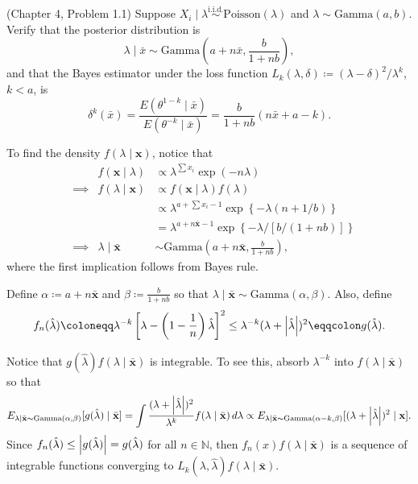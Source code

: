 \begin{question}
  (Chapter 4, Problem 1.1) Suppose \( X_i \mid \lambda \overset{\text{i.i.d.}}{\sim} \mathrm{Poisson}(\lambda)\) and \( \lambda \sim \mathrm{Gamma}(a,b) \). Verify that the posterior distribution is
  \[
    \lambda \mid \bar{x} \sim \mathrm{Gamma}\left( a + n\bar{x}, \frac{b}{1+nb} \right),
  \]
  and that the Bayes estimator under the loss function \( L_k(\lambda, \delta) \coloneqq  (\lambda - \delta)^2 / \lambda^{k} \), \( k < a \), is
  \[
    \delta^{k}(\bar{x}) = \frac{E(\theta^{1-k} \mid  \bar{x})}{E(\theta^{-k} \mid  \bar{x})} = \frac{b}{1+nb} (n\bar{x} + a - k).
  \]
\end{question}

\begin{solution}
  To find the density \( f(\lambda \mid \mathbf{x}) \), notice that
  \[
    \begin{aligned}
       &          & f(\mathbf{x} \mid \lambda)    & \propto \lambda^{\sum x_i} \exp ({-n \lambda})                                           \\
       & \implies & f(\lambda \mid  \mathbf{x})   & \propto f(\mathbf{x} \mid  \lambda) f(\lambda)                                           \\
       &          &                               & \propto \lambda^{a + \sum x_i - 1} \exp \left\{ {-\lambda (n + 1 / b)} \right\}          \\
       &          &                               & = \lambda^{a + n \bar{\mathbf{x}} - 1} \exp \left\{ {-\lambda / [b / (1 + nb)]} \right\} \\
       & \implies & \lambda \mid \bar{\mathbf{x}} & \sim \mathrm{Gamma}\left(a + n\bar{\mathbf{x}}, \frac{b}{1+nb}\right),
    \end{aligned}
  \]
  where the first implication follows from Bayes rule.

  Define \( \alpha \coloneqq  a + n\bar{\mathbf{x}} \) and \( \beta \coloneqq \frac{b}{1+nb} \) so that \( \lambda \mid \bar{\mathbf{x}} \sim \mathrm{Gamma}(\alpha, \beta) \). Also, define
  \[
    f_n(\hat{\lambda}) \coloneqq \lambda^{-k} \left[\lambda - \left(1-\frac{1}{n}\right)\hat{\lambda}\right]^2 \le \lambda^{-k} (\lambda + \abs{\hat{\lambda}})^2 \eqqcolon  g(\hat{\lambda}).
  \]

  Notice that \( g(\hat{\lambda}) f(\lambda \mid \bar{\mathbf{x}}) \) is integrable. To see this, absorb \( \lambda^{-k} \) into \( f(\lambda \mid \bar{\mathbf{x}}) \) so that
  \[
    E_{\lambda \mid \bar{\mathbf{x}} \sim  \mathrm{Gamma}(\alpha, \beta)}[g(\hat{\lambda}) \mid \bar{\mathbf{x}}] = \int \frac{(\lambda + \left\lvert\hat{\lambda}\right\rvert)^2}{\lambda^{k}} f(\lambda \mid \bar{\mathbf{x}})\, d\lambda \propto E_{\lambda \mid \bar{\mathbf{x}} \sim  \mathrm{Gamma}(\alpha - k, \beta)}[(\lambda + \left\lvert\hat{\lambda}\right\rvert)^2 \mid \mathbf{x}].
  \]
  Since \( f_n(\hat{\lambda}) \le \left\lvert g(\hat{\lambda})\right\rvert = g(\hat{\lambda}) \) for all \( n \in \mathbb{ N } \), then \( f_n(x) f(\lambda \mid \bar{\mathbf{x}}) \) is a sequence of integrable functions converging to \( L_k(\lambda, \hat{\lambda}) f(\lambda \mid \bar{\mathbf{x}}) \).


\end{solution}
